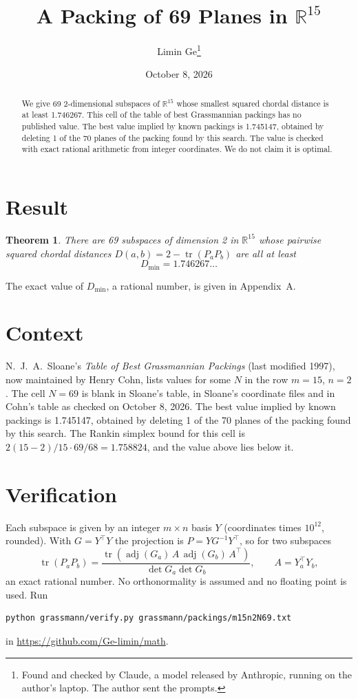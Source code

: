 \documentclass[11pt,a4paper]{article}
\title{A Packing of 69 Planes in $\mathbb{R}^{15}$}
\author{Limin Ge\thanks{Found and checked by Claude, a model released by Anthropic, running on the author's laptop. The author sent the prompts.}}
\date{October 8, 2026}
\newtheorem*{theorem}{Theorem}
\begin{document}
\maketitle
\begin{abstract}
We give 69 2-dimensional subspaces of $\mathbb{R}^{15}$ whose smallest squared chordal distance is at least 1.746267. This cell of the table of best Grassmannian packings has no published value. The best value implied by known packings is 1.745147, obtained by deleting 1 of the 70 planes of the packing found by this search. The value is checked with exact rational arithmetic from integer coordinates. We do not claim it is optimal.
\end{abstract}

\section{Result}
\begin{theorem}
There are 69 subspaces of dimension 2 in $\mathbb{R}^{15}$ whose pairwise squared chordal distances $D(a,b) = 2 - \operatorname{tr}(P_aP_b)$ are all at least
\[ D_{\min} = 1.746267\ldots \]
\end{theorem}
The exact value of $D_{\min}$, a rational number, is given in Appendix~A.


\section{Context}
N.~J.~A.~Sloane's \emph{Table of Best Grassmannian Packings} (last modified 1997), now maintained by Henry Cohn, lists values for some $N$ in the row $m=15$, $n=2$. The cell $N=69$ is blank in Sloane's table, in Sloane's coordinate files and in Cohn's table as checked on October 8, 2026. The best value implied by known packings is 1.745147, obtained by deleting 1 of the 70 planes of the packing found by this search. The Rankin simplex bound for this cell is $2(15-2)/15\cdot 69/68 = 1.758824$, and the value above lies below it.


\section{Verification}
Each subspace is given by an integer $m\times n$ basis $Y$ (coordinates times $10^{12}$, rounded). With $G=Y^\top Y$ the projection is $P=YG^{-1}Y^\top$, so for two subspaces
\[ \operatorname{tr}(P_aP_b)=\frac{\operatorname{tr}(\operatorname{adj}(G_a)\,A\,\operatorname{adj}(G_b)\,A^\top)}{\det G_a\det G_b},\qquad A=Y_a^\top Y_b, \]
an exact rational number. No orthonormality is assumed and no floating point is used. Run
\begin{verbatim}
python grassmann/verify.py grassmann/packings/m15n2N69.txt
\end{verbatim}
in \url{https://github.com/Ge-limin/math}.
\end{document}
